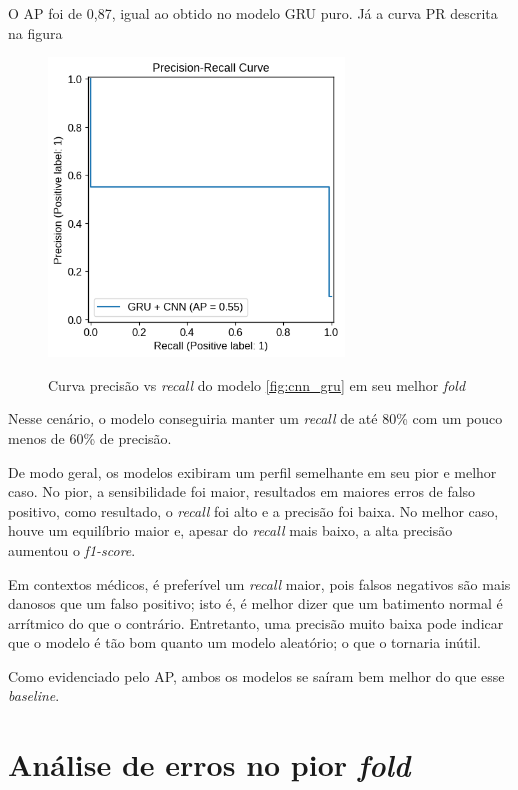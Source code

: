 O AP foi de 0,87, igual ao obtido no modelo GRU puro. Já a curva PR descrita na figura

\begin{figure}[H]
  \centering
  \caption{Curva precisão vs \textit{recall} do modelo \ref{fig:cnn_gru} em seu melhor \textit{fold}}
   \includegraphics[width=0.7\textwidth]{figuras/modelos_resultados/gru_cnn/ap_gru_cnn_pior_fold_3.png} 
  \label{fig:ap_cnn_gru_pior_fold}
\end{figure}

Nesse cenário, o modelo conseguiria manter um \textit{recall} de até 80\% com um pouco menos de 60\% de precisão.

De modo geral, os modelos exibiram um perfil semelhante em seu pior e melhor caso. No pior, a sensibilidade foi maior, resultados
em maiores erros de falso positivo, como resultado, o \textit{recall} foi alto e a precisão foi baixa. No melhor caso, houve um 
equilíbrio maior e, apesar do \textit{recall} mais baixo, a alta precisão aumentou o \textit{f1-score}.

Em contextos médicos, é preferível um \textit{recall} maior, pois falsos negativos são mais danosos que um falso positivo; isto é, é melhor
dizer que um batimento normal é arrítmico do que o contrário. Entretanto, uma precisão muito baixa pode indicar que o modelo é 
tão bom quanto um modelo aleatório; o que o tornaria inútil. 

Como evidenciado pelo AP, ambos os modelos se saíram bem melhor do que esse \textit{baseline}.

\chapter{Análise de erros no pior \textit{fold}}
\label{ch:analise_erros_pior_fold}

